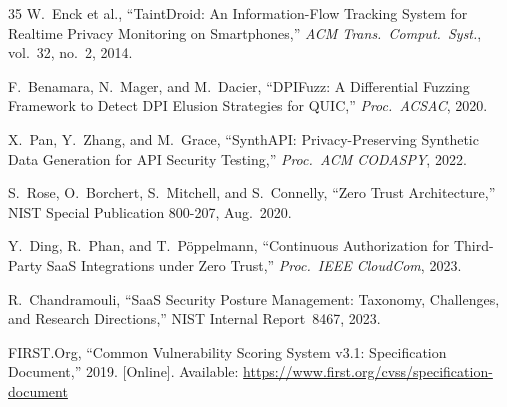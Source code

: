 \documentclass[conference]{IEEEtran}
\begin{document}
\begin{thebibliography}{35}
W.~Enck et al., ``TaintDroid: An Information-Flow Tracking System
for Realtime Privacy Monitoring on Smartphones,'' \textit{ACM Trans.\
Comput.\ Syst.}, vol.~32, no.~2, 2014.

F.~Benamara, N.~Mager, and M.~Dacier, ``DPIFuzz: A Differential
Fuzzing Framework to Detect DPI Elusion Strategies for QUIC,''
\textit{Proc.\ ACSAC}, 2020.

X.~Pan, Y.~Zhang, and M.~Grace, ``SynthAPI: Privacy-Preserving
Synthetic Data Generation for API Security Testing,'' \textit{Proc.\
ACM CODASPY}, 2022.

S.~Rose, O.~Borchert, S.~Mitchell, and S.~Connelly, ``Zero Trust
Architecture,'' NIST Special Publication 800-207, Aug.~2020.

Y.~Ding, R.~Phan, and T.~P\"{o}ppelmann, ``Continuous Authorization
for Third-Party SaaS Integrations under Zero Trust,'' \textit{Proc.\
IEEE CloudCom}, 2023.

\bibitem{chandramouli2023}
R.~Chandramouli, ``SaaS Security Posture Management: Taxonomy,
Challenges, and Research Directions,'' NIST Internal Report~8467,
2023.

\bibitem{cvss31}
FIRST.Org, ``Common Vulnerability Scoring System v3.1: Specification
Document,'' 2019. [Online]. Available:
\url{https://www.first.org/cvss/specification-document}

\end{thebibliography}
\end{document}
